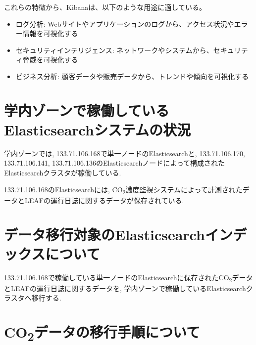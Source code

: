 これらの特徴から、Kibanaは、以下のような用途に適している。

\begin{itemize}
  \item ログ分析: Webサイトやアプリケーションのログから、アクセス状況やエラー情報を可視化する
  \item セキュリティインテリジェンス: ネットワークやシステムから、セキュリティ脅威を可視化する
  \item ビジネス分析: 顧客データや販売データから、トレンドや傾向を可視化する
\end{itemize}

\section{学内ゾーンで稼働しているElasticsearchシステムの状況}
学内ゾーンでは, 133.71.106.168で単一ノードのElasticsearchと, 133.71.106.170, 133.71.106.141, 133.71.106.136のElasticsearchノードによって構成されたElasticsearchクラスタが稼働している.

133.71.106.168のElasticsearchには, CO\textsubscript{2}濃度監視システムによって計測されたデータとLEAFの運行日誌に関するデータが保存されている.



\section{データ移行対象のElasticsearchインデックスについて}

133.71.106.168で稼働している単一ノードのElasticsearchに保存されたCO\textsubscript{2}データとLEAFの運行日誌に関するデータを, 学内ゾーンで稼働しているElasticsearchクラスタへ移行する.

\section{CO\textsubscript{2}データの移行手順について}

